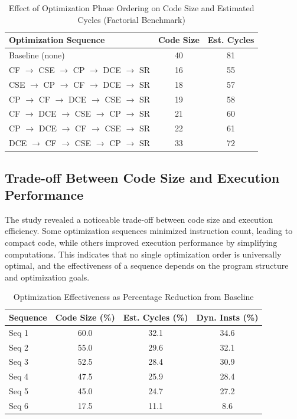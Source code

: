 \documentclass[conference]{IEEEtran}
\begin{document}
\begin{table}[!htbp]
\centering
\caption{Effect of Optimization Phase Ordering on Code Size and Estimated Cycles (Factorial Benchmark)}
\label{tab:phase_order_tradeoff}
\renewcommand{\arraystretch}{1.2}
{\small
\begin{tabularx}{\columnwidth}{@{}Xcc@{}}
\toprule
\textbf{Optimization Sequence} & \textbf{Code Size} & \textbf{Est. Cycles} \\
\midrule
Baseline (none) & 40 & 81 \\
CF $\to$ CSE $\to$ CP $\to$ DCE $\to$ SR & 16 & 55 \\
CSE $\to$ CP $\to$ CF $\to$ DCE $\to$ SR & 18 & 57 \\
CP $\to$ CF $\to$ DCE $\to$ CSE $\to$ SR & 19 & 58 \\
CF $\to$ DCE $\to$ CSE $\to$ CP $\to$ SR & 21 & 60 \\
CP $\to$ DCE $\to$ CF $\to$ CSE $\to$ SR & 22 & 61 \\
DCE $\to$ CF $\to$ CSE $\to$ CP $\to$ SR & 33 & 72 \\
\bottomrule
\end{tabularx}
}
\end{table}

\subsection{Trade-off Between Code Size and Execution Performance}
The study revealed a noticeable trade-off between code size and execution efficiency. Some optimization sequences minimized instruction count, leading to compact code, while others improved execution performance by simplifying computations. This indicates that no single optimization order is universally optimal, and the effectiveness of a sequence depends on the program structure and optimization goals.

\begin{table}[!htbp]
\centering
\caption{Optimization Effectiveness as Percentage Reduction from Baseline}
\label{tab:optimization_reduction}
\renewcommand{\arraystretch}{1.2}
\begin{tabularx}{\columnwidth}{@{}Xccc@{}}
\toprule
\textbf{Sequence} & \textbf{Code Size (\%)} & \textbf{Est. Cycles (\%)} & \textbf{Dyn. Insts (\%)} \\
\midrule
Seq 1 & 60.0 & 32.1 & 34.6 \\
Seq 2 & 55.0 & 29.6 & 32.1 \\
Seq 3 & 52.5 & 28.4 & 30.9 \\
Seq 4 & 47.5 & 25.9 & 28.4 \\
Seq 5 & 45.0 & 24.7 & 27.2 \\
Seq 6 & 17.5 & 11.1 & 8.6 \\
\bottomrule
\end{tabularx}
\end{table}
\end{document}
